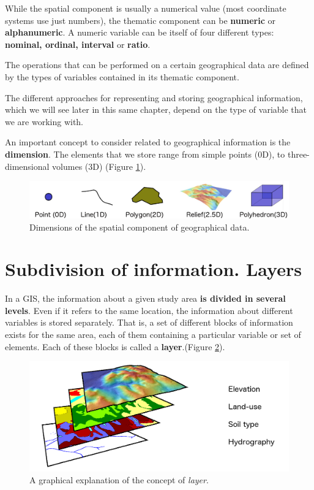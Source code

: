 While the spatial component is usually a numerical value (most coordinate systems use just numbers), the thematic component can be \textbf{numeric} or \textbf{alphanumeric}. A numeric variable can be itself of four different types: \textbf{nominal, ordinal, interval} or \textbf{ratio}.

The operations that can be performed on a certain geographical data are defined by the types of variables contained in its thematic component.

The different approaches for representing and storing geographical information, which we will see later in this same chapter, depend on the type of variable that we are working with.

An important concept to consider related to geographical information is the \textbf{dimension}. The elements that we store range from simple points (0D), to three-dimensional volumes (3D) (Figure \ref{Fig:Dimensions}).

\begin{figure}[!hbt] 
\centering
\includegraphics[width=\textwidth]{Data/Dimensions.png}
\caption{\small Dimensions of the spatial component of geographical data.}
\label{Fig:Dimensions} 
\end{figure}


\section{Subdivision of information. Layers}

In a GIS, the information about a given study area \textbf{is divided in several levels}. Even if it refers to the same location, the information about different variables is stored separately. That is, a set of different blocks of information exists for the same area, each of them containing a particular variable or set of elements. Each of these blocks is called a \textbf{layer}.(Figure \ref{Fig:Concept_layer}). 

\begin{figure}[!hbt] 
\centering
\includegraphics[width=\textwidth]{Data/Concept_layer.png}
\caption{\small A graphical explanation of the concept of \emph{layer}.}
\label{Fig:Concept_layer} 
\end{figure}

